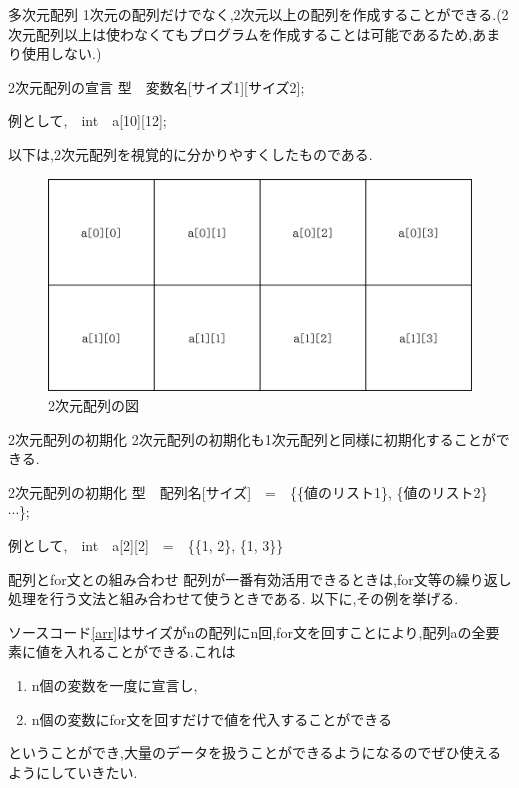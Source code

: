 \begin{frame}{多次元配列}
    1次元の配列だけでなく,2次元以上の配列を作成することができる.(2次元配列以上は使わなくてもプログラムを作成することは可能であるため,あまり使用しない.)
    \begin{block}{2次元配列の宣言}
        型　変数名[サイズ1][サイズ2];
        
        例として,　int　a[10][12];
    \end{block}
    以下は,2次元配列を視覚的に分かりやすくしたものである.
    \begin{figure}[h]
        \centering
        \includegraphics[width=0.4\linewidth]{png/2d_arr.png}
        \caption{2次元配列の図}
        \label{fig:enter-label}
    \end{figure}
\end{frame}

\begin{frame}{2次元配列の初期化}
    2次元配列の初期化も1次元配列と同様に初期化することができる.
    \begin{block}{2次元配列の初期化}
        型　配列名[サイズ]　=　\{\{値のリスト1\}, \{値のリスト2\}　$\cdots$\};
        
        例として,　int　a[2][2]　=　\{\{1, 2\}, \{1, 3\}\}

    \end{block}
\end{frame}

\begin{frame}{配列とfor文との組み合わせ}
    配列が一番有効活用できるときは,for文等の繰り返し処理を行う文法と組み合わせて使うときである.
    以下に,その例を挙げる.
    \begin{minipage}{\linewidth}
        
    \end{minipage}

    \newpage

    ソースコード\ref{arr}はサイズがnの配列にn回,for文を回すことにより,配列aの全要素に値を入れることができる.これは
    \begin{enumerate}
        \item n個の変数を一度に宣言し,
        \item n個の変数にfor文を回すだけで値を代入することができる
    \end{enumerate}
    ということができ,大量のデータを扱うことができるようになるのでぜひ使えるようにしていきたい.
\end{frame}

